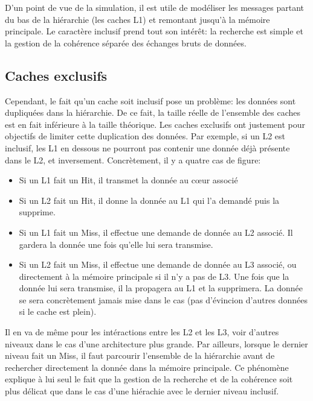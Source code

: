 \documentclass[a4paper]{article}
\begin{document}
\indent D'un point de vue de la simulation, il est utile de modéliser les messages partant du bas de la hiérarchie (les caches L1) et remontant jusqu'à la mémoire principale. Le caractère inclusif prend tout son intérêt: la recherche est simple et la gestion de la cohérence séparée des échanges bruts de données.

\newpage
\subsection{Caches exclusifs}
\indent Cependant, le fait qu'un cache soit inclusif pose un problème: les données sont dupliquées dans la hiérarchie. De ce fait, la taille réelle de l'ensemble des caches est en fait inférieure à la taille théorique. Les caches exclusifs ont justement pour objectifs de limiter cette duplication des données. Par exemple, si un L2 est inclusif, les L1 en dessous ne pourront pas contenir une donnée déjà présente dans le L2, et inversement. Concrètement, il y a quatre cas de figure: \\

\begin{itemize}
\item Si un L1 fait un Hit, il transmet la donnée au c{\oe}ur associé
\item Si un L2 fait un Hit, il donne la donnée au L1 qui l'a demandé puis la supprime.
\item Si un L1 fait un Miss, il effectue une demande de donnée au L2 associé. Il gardera la donnée une fois qu'elle lui sera transmise.
\item Si un L2 fait un Miss, il effectue une demande de donnée au L3 associé, ou directement à la mémoire principale si il n'y a pas de L3. Une fois que la donnée lui sera transmise, il la propagera au L1 et la supprimera. La donnée se sera concrètement jamais mise dans le cas (pas d'évincion d'autres données si le cache est plein). \\
\end{itemize}

\indent Il en va de même pour les intéractions entre les L2 et les L3, voir d'autres niveaux dans le cas d'une architecture plus grande. Par ailleurs, lorsque le dernier niveau fait un Miss, il faut parcourir l'ensemble de la hiérarchie avant de rechercher directement la donnée dans la mémoire principale. Ce phénomène explique à lui seul le fait que la gestion de la recherche et de la cohérence soit plus délicat que dans le cas d'une hiérachie avec le dernier niveau inclusif.
\end{document}
